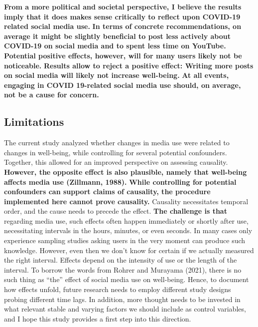 \documentclass[
  man,mask]{apa7}
\begin{document}
\textbf{From a more political and societal perspective, I believe the results imply that it does makes sense critically to reflect upon COVID-19 related social media use.}
\textbf{In terms of concrete recommendations, on average it might be slightly beneficial to post less actively about COVID-19 on social media and to spent less time on YouTube.}
\textbf{Potential positive effects, however, will for many users likely not be noticeable.}
\textbf{Results allow to reject a positive effect: Writing more posts on social media will likely not increase well-being.}
\textbf{At all events, engaging in COVID 19-related social media use should, on average, not be a cause for concern.}

\hypertarget{limitations}{%
\subsection{Limitations}\label{limitations}}

The current study analyzed whether changes in media use were related to changes in well-being, while controlling for several potential confounders.
Together, this allowed for an improved perspective on assessing causality.
\textbf{However, the opposite effect is also plausible, namely that well-being affects media use (Zillmann, 1988).}
\textbf{While controlling for potential confounders can support claims of causality, the procedure implemented here cannot prove causality.}
Causality necessitates temporal order, and the cause needs to precede the effect.
\textbf{The challenge is that} regarding media use, such effects often happen immediately or shortly after use, necessitating intervals in the hours, minutes, or even seconds.
In many cases only experience sampling studies asking users in the very moment can produce such knowledge.
However, even then we don't know for certain if we actually measured the right interval.
Effects depend on the intensity of use or the length of the interval.
To borrow the words from Rohrer and Murayama (2021), there is no such thing as ``the'' effect of social media use on well-being.
Hence, to document how effects unfold, future research needs to employ different study designs probing different time lags.
In addition, more thought needs to be invested in what relevant stable and varying factors we should include as control variables, and I hope this study provides a first step into this direction.
\end{document}
